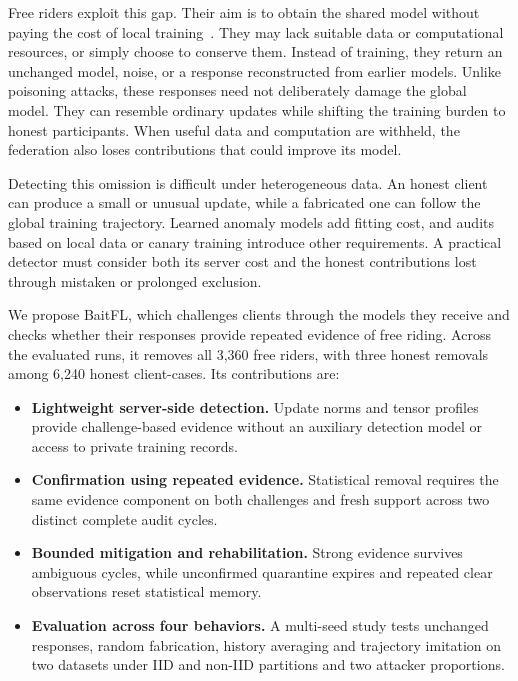 \documentclass[conference]{IEEEtran}
\begin{document}
Free riders exploit this gap. Their aim is to obtain the shared model
without paying the cost of local training~\cite{lin2019freeriders,fraboni2021freerider}.
They may lack suitable data or computational resources, or simply choose
to conserve them. Instead of training, they return an unchanged model,
noise, or a response reconstructed from earlier models. Unlike poisoning
attacks, these responses need not deliberately damage the global model.
They can resemble ordinary updates while shifting the training burden
to honest participants. When useful data and computation are withheld,
the federation also loses contributions that could improve its model.

Detecting this omission is difficult under heterogeneous data. An honest
client can produce a small or unusual update, while a fabricated one can
follow the global training trajectory. Learned anomaly models add fitting
cost, and audits based on local data or canary training introduce other
requirements. A practical detector must consider both its server cost
and the honest contributions lost through mistaken or prolonged exclusion.

We propose BaitFL, which challenges clients through the models they receive
and checks whether their responses provide repeated evidence of free
riding. Across the evaluated runs, it removes all 3,360 free riders,
with three honest removals among 6,240 honest client-cases.
Its contributions are:
\begin{itemize}
\item \textbf{Lightweight server-side detection.} Update norms and tensor
profiles provide challenge-based evidence without an auxiliary detection
model or access to private training records.
\item \textbf{Confirmation using repeated evidence.} Statistical removal
requires the same evidence component on both challenges and fresh support
across two distinct complete audit cycles.
\item \textbf{Bounded mitigation and rehabilitation.} Strong evidence
survives ambiguous cycles, while unconfirmed quarantine expires and
repeated clear observations reset statistical memory.
\item \textbf{Evaluation across four behaviors.} A multi-seed study tests
unchanged responses, random fabrication, history averaging and trajectory
imitation on two datasets under IID and non-IID partitions and two
attacker proportions.
\end{itemize}
\end{document}
